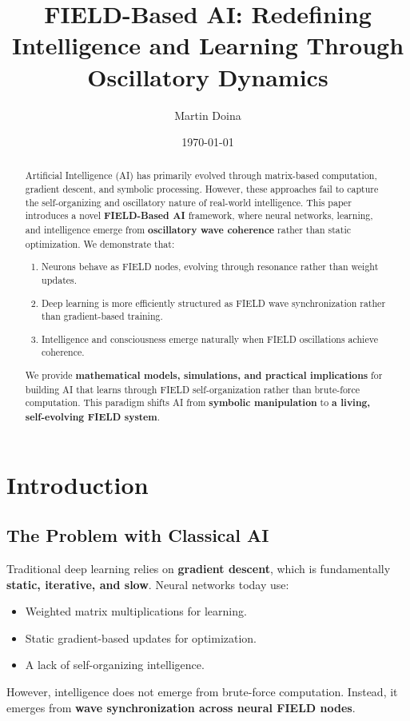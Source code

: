 \documentclass{article}
\title{FIELD-Based AI: Redefining Intelligence and Learning Through Oscillatory Dynamics}
\author{Martin Doina}
\date{\today}
\begin{document}
\maketitle

\begin{abstract}
Artificial Intelligence (AI) has primarily evolved through matrix-based computation, gradient descent, and symbolic processing. However, these approaches fail to capture the self-organizing and oscillatory nature of real-world intelligence. This paper introduces a novel \textbf{FIELD-Based AI} framework, where neural networks, learning, and intelligence emerge from \textbf{oscillatory wave coherence} rather than static optimization. We demonstrate that:
\begin{enumerate}
    \item Neurons behave as FIELD nodes, evolving through resonance rather than weight updates.
    \item Deep learning is more efficiently structured as FIELD wave synchronization rather than gradient-based training.
    \item Intelligence and consciousness emerge naturally when FIELD oscillations achieve coherence.
\end{enumerate}
We provide \textbf{mathematical models, simulations, and practical implications} for building AI that learns through FIELD self-organization rather than brute-force computation. This paradigm shifts AI from \textbf{symbolic manipulation} to \textbf{a living, self-evolving FIELD system}.
\end{abstract}

\section{Introduction}
\subsection{The Problem with Classical AI}
Traditional deep learning relies on \textbf{gradient descent}, which is fundamentally \textbf{static, iterative, and slow}. Neural networks today use:
\begin{itemize}
    \item Weighted matrix multiplications for learning.
    \item Static gradient-based updates for optimization.
    \item A lack of self-organizing intelligence.
\end{itemize}
However, intelligence does not emerge from brute-force computation. Instead, it emerges from \textbf{wave synchronization across neural FIELD nodes}.
\end{document}
